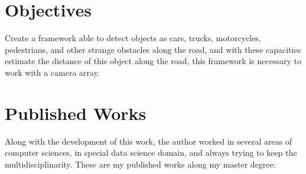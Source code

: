 \section{Objectives}

Create a framework able to detect objects as cars, trucks, motorcycles, pedestrians, and other strange obstacles along the road, and with these capacities estimate the distance of this object along the road, this framework is necessary to work with a camera array.

\section{Published Works}

Along with the development of this work, the author worked in several areas of computer sciences, in special data science domain, and always trying to keep the multidisciplinarity. These are my published works along my master degree:

